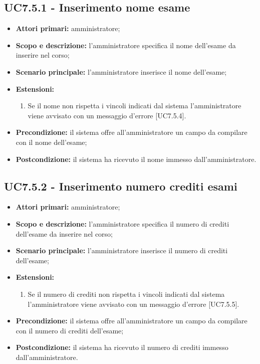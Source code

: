 \documentclass[AnalisiDeiRequisiti.tex]{subfiles}
\begin{document}
\subsection{UC7.5.1 - Inserimento nome esame}
\begin{itemize}
	\item \textbf{Attori primari:} amministratore;
	\item \textbf{Scopo e descrizione:} l'amministratore specifica il nome dell'esame da inserire nel corso;
	\item \textbf{Scenario principale:} l'amministratore inserisce il nome dell'esame;
	\item \textbf{Estensioni:}
	\begin{enumerate}
		\item Se il nome non rispetta i vincoli indicati dal sistema l'amministratore viene avvisato con un messaggio d'errore [UC7.5.4].
	\end{enumerate}
	\item \textbf{Precondizione:} il sistema offre all'amministratore un campo da compilare con il nome dell'esame; 
	\item \textbf{Postcondizione:} il sistema ha ricevuto il nome immesso dall'amministratore.
\end{itemize}
\subsection{UC7.5.2 - Inserimento numero crediti esami}
\begin{itemize}
	\item \textbf{Attori primari:} amministratore;
	\item \textbf{Scopo e descrizione:} l'amministratore specifica il numero di crediti dell'esame da inserire nel corso;
	\item \textbf{Scenario principale:} l'amministratore inserisce il numero di crediti dell'esame;
	\item \textbf{Estensioni:}
	\begin{enumerate}
		\item Se il numero di crediti non rispetta i vincoli indicati dal sistema l'amministratore viene avvisato con un messaggio d'errore [UC7.5.5].
	\end{enumerate}
	\item \textbf{Precondizione:} il sistema offre all'amministratore un campo da compilare con il numero di crediti dell'esame; 
	\item \textbf{Postcondizione:} il sistema ha ricevuto il numero di crediti immesso dall'amministratore.
\end{itemize}
\end{document}
